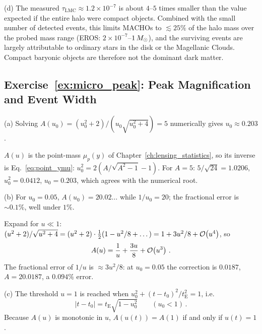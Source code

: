 (d) The measured $\tau_{\mathrm{LMC}}\approx1.2\times10^{-7}$ is about
$4$--$5$ times smaller than the value expected if the entire halo were compact
objects.  Combined with the small number of detected events, this limits
MACHOs to $\lesssim25\%$ of the halo mass over the probed mass range (EROS:
$2\times10^{-7}$--$1\,M_{\odot}$), and the
surviving events are largely attributable to ordinary stars in the disk or the
Magellanic Clouds.  Compact baryonic objects are therefore not the
dominant dark matter. \checkmark


\subsection*{Exercise~\ref{ex:micro_peak}: Peak Magnification and Event Width}

(a) Solving $A(u_0) = (u_0^2+2)/(u_0\sqrt{u_0^2+4}) = 5$ numerically
gives $u_0 \approx 0.203$.

\begin{derivation}
$A(u)$ is the point-mass $\mu_p(y)$ of Chapter~\ref{ch:lensing_statistics}, so
its inverse is Eq.~\eqref{eq:point_ymu}:
$u_0^2 = 2\left(A/\sqrt{A^2-1} - 1\right)$.  For $A = 5$:
$5/\sqrt{24} = 1.0206$, $u_0^2 = 0.0412$, $u_0 = 0.203$, which agrees with
the numerical root.
\end{derivation}

(b) For $u_0 = 0.05$, $A(u_0) = 20.02\ldots$ while $1/u_0 = 20$; the
fractional error is $\sim\!0.1\%$, well under $1\%$. \checkmark

\begin{derivation}
Expand for $u \ll 1$:
$(u^2+2)/\sqrt{u^2+4} = (u^2+2)\cdot\tfrac12(1 - u^2/8 + \dots) = 1 + 3u^2/8
+ \mathcal{O}\!\left(u^4\right)$, so
\begin{equation*}
    A(u) = \frac1u + \frac{3u}{8} + \mathcal{O}\!\left(u^3\right)\,.
\end{equation*}
The fractional error of $1/u$ is $\approx 3u^2/8$: at $u_0 = 0.05$ the
correction is $0.0187$, $A = 20.0187$, a $0.094\%$ error.
\end{derivation}

(c) The threshold $u = 1$ is reached when
$u_0^2 + (t-t_0)^2/t_{\mathrm{E}}^2 = 1$, i.e.
\begin{equation*}
    |t - t_0| = t_{\mathrm{E}}\sqrt{1 - u_0^2}
    \qquad (u_0 < 1) \,.
\end{equation*}
Because $A(u)$ is monotonic in $u$, $A(u(t)) = A(1)$ if and only if
$u(t) = 1$. \checkmark


